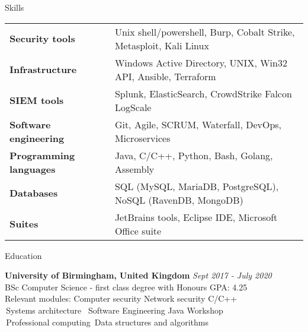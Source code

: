 \documentclass{resume} %
\begin{document}

\begin{rSection}{Skills}

\begin{tabular}{ @{} >{\bfseries}l @{\hspace{6ex}} l }
Security tools \ & Unix shell/powershell, Burp, Cobalt Strike, Metasploit, Kali Linux \\
Infrastructure \ & Windows Active Directory, UNIX, Win32 API, Ansible, Terraform \\
SIEM tools \ & Splunk, ElasticSearch, CrowdStrike Falcon LogScale \\
Software engineering \ & Git, Agile, SCRUM, Waterfall, DevOps, Microservices \\
Programming languages \ & Java, C/C++, Python, Bash, Golang, Assembly \\
Databases \ & SQL (MySQL, MariaDB, PostgreSQL), NoSQL (RavenDB, MongoDB) \\
Suites \ & JetBrains tools, Eclipse IDE, Microsoft Office suite \\
\end{tabular}

\end{rSection}


\begin{rSection}{Education}

{\bf University of Birmingham, United Kingdom} \hfill {\em Sept 2017 - July 2020} 
\\ BSc Computer Science - first class degree with Honours \hfill { GPA: 4.25 }
\\ Relevant modules: \quad Computer security \quad \hphantom{ssss:} Network security \quad \hphantom{ssss} C/C++ 
\\ \hphantom{ssssssssssssssssssssss:} \,Systems architecture \hphantom{ss}\, \quad Software Engineering \quad Java Workshop
\\ \hphantom{ssssssssssssssssssssss:} \,Professional computing \quad \,Data structures and algorithms


\end{rSection}
\end{document}
